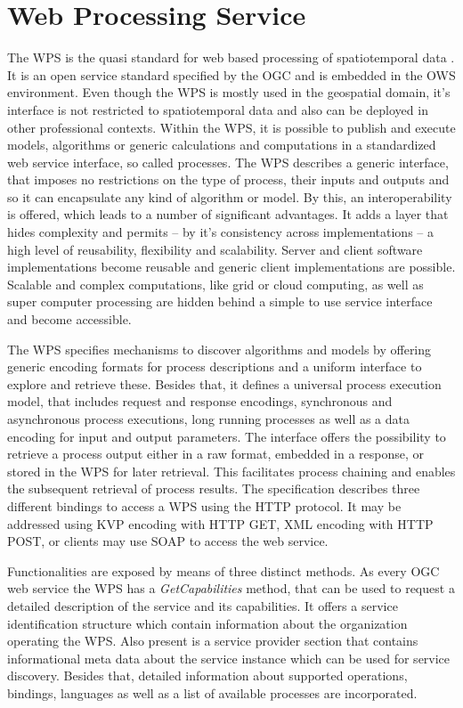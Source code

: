 \chapter{Web Processing Service}
	\label{sec:wps}
	The \ac{WPS} \citep{ogc:wps} is the quasi standard for web based processing of spatiotemporal data \citep{foerster2012live}. It is an open service standard specified by the \ac{OGC} and is embedded in the \ac{OWS} \citep{ogc:ows} environment. Even though the \ac{WPS} is mostly used in the geospatial domain, it's interface is not restricted to spatiotemporal data and also can be deployed in other professional contexts. Within the WPS, it is possible to publish and execute models, algorithms or generic calculations and computations in a standardized web service interface, so called processes. The \ac{WPS} describes a generic interface, that imposes no restrictions on the type of process, their inputs and outputs and so it can encapsulate any kind of algorithm or model. By this, an interoperability is offered, which leads to a number of significant advantages. It adds a layer that hides complexity and permits -- by it's consistency across implementations -- a high level of reusability, flexibility and scalability. Server and client software implementations become reusable and generic client implementations are possible. Scalable and complex computations, like grid or cloud computing, as well as super computer processing are hidden behind a simple to use service interface and become accessible.

	The \ac{WPS} specifies mechanisms to discover algorithms and models by offering generic encoding formats for process descriptions and a uniform interface to explore and retrieve these. Besides that, it defines a universal process execution model, that includes request and response encodings, synchronous and asynchronous process executions, long running processes as well as a data encoding for input and output parameters. The interface offers the possibility to retrieve a process output either in a raw format, embedded in a response, or stored in the \ac{WPS} for later retrieval. This facilitates process chaining and enables the subsequent retrieval of process results. The specification describes three different bindings to access a \ac{WPS} using the HTTP protocol. It may be addressed using \ac{KVP} encoding with HTTP GET, XML encoding with HTTP POST, or clients may use SOAP \citep{w3c:soap1} to access the web service.

	Functionalities are exposed by means of three distinct methods. As every \ac{OGC} web service the \ac{WPS} has a \emph{GetCapabilities} method, that can be used to request a detailed description of the service and its capabilities. It offers a service identification structure which contain information about the organization operating the \ac{WPS}.  Also present is a service provider section that contains informational meta data about the service instance which can be used for service discovery. Besides that, detailed information about supported operations, bindings, languages as well as a list of available processes are incorporated.

